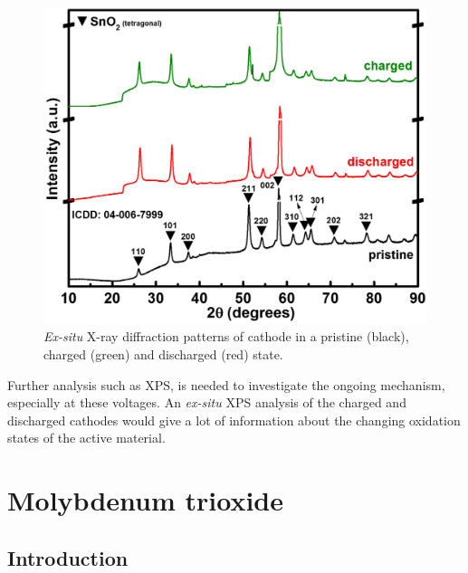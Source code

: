  \begin{figure}[th!]
  \centering
  \includegraphics[width=\textwidth]{Figures/chap6fig/SnO2XRD}
    \caption{\textit{Ex-situ} X-ray diffraction patterns of  cathode in a pristine (black), charged (green) and discharged (red) state.}
  \label{Figures/chap6fig:SnO2XRD}
\end{figure}

Further analysis such as XPS, is needed to investigate the ongoing mechanism, especially at these voltages. An \textit{ex-situ} XPS analysis of the charged and discharged cathodes would give a lot of information about the changing oxidation states of the active material.


\section{Molybdenum trioxide}

\subsection{Introduction}

